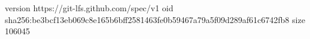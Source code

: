 version https://git-lfs.github.com/spec/v1
oid sha256:be3bcf13eb069c8e165b6bff2581463fe0b59467a79a5f09d289af61c6742fb8
size 106045
